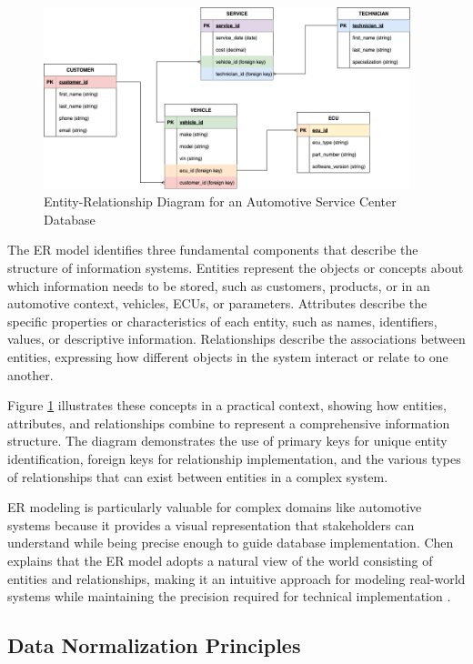 \begin{figure}[ht]
    \centering
    \includegraphics[width=0.95\textwidth]{figures/er_diagram.png}
    \caption{Entity-Relationship Diagram for an Automotive Service Center Database}
    \label{fig:er-diagram}
\end{figure}

The \ac{ER} model identifies three fundamental components that describe the structure of information systems. Entities represent the objects or concepts about which information needs to be stored, such as customers, products, or in an automotive context, vehicles, \acp{ECU}, or parameters. Attributes describe the specific properties or characteristics of each entity, such as names, identifiers, values, or descriptive information. Relationships describe the associations between entities, expressing how different objects in the system interact or relate to one another.

Figure \ref{fig:er-diagram} illustrates these concepts in a practical context, showing how entities, attributes, and relationships combine to represent a comprehensive information structure. The diagram demonstrates the use of primary keys for unique entity identification, foreign keys for relationship implementation, and the various types of relationships that can exist between entities in a complex system.

\ac{ER} modeling is particularly valuable for complex domains like automotive systems because it provides a visual representation that stakeholders can understand while being precise enough to guide database implementation. Chen explains that the \ac{ER} model adopts a natural view of the world consisting of entities and relationships, making it an intuitive approach for modeling real-world systems while maintaining the precision required for technical implementation \cite{chen1976entity}.

\subsection{Data Normalization Principles}
\label{subsec:data-normalization}

